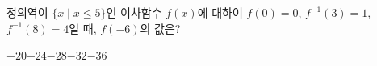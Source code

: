 정의역이 $\{x \mid x\le 5\}$인 이차함수 $f(x)$에 대하여 $f(0)=0$, $f^{-1}(3)=1$, $f^{-1}(8)=4$일 때, $f(-6)$의 값은?
\begin{choices32}{$-20$}{$-24$}{$-28$}{$-32$}{$-36$}\end{choices32}
